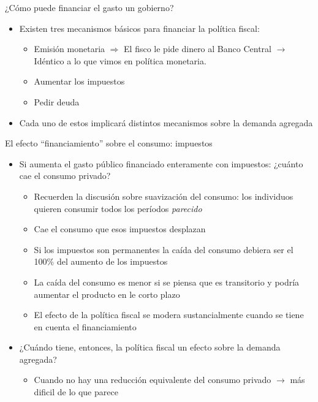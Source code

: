 \documentclass{beamer}
\begin{document}
\begin{frame}{¿Cómo puede financiar el gasto un gobierno?}
    \begin{itemize}
        \item Existen tres mecanismos básicos para financiar la política fiscal:
        \begin{itemize}
            \item Emisión monetaria $\Rightarrow$ El fisco le pide dinero al Banco Central $\rightarrow$ Idéntico a lo que vimos en política monetaria.
            \item Aumentar los impuestos 
            \item Pedir deuda
        \end{itemize}
        \item Cada uno de estos implicará distintos mecanismos sobre la demanda agregada
    \end{itemize}
\end{frame}

\begin{frame}{El efecto “financiamiento” sobre el consumo: impuestos}
    \begin{itemize}
        \item Si aumenta el gasto público financiado enteramente con impuestos: ¿cuánto cae el consumo privado?
        \begin{itemize}
            \item Recuerden la discusión sobre suavización del consumo: los individuos quieren consumir todos los períodos \textit{parecido}
            \item Cae el consumo que esos impuestos desplazan
            \item Si los impuestos son permanentes la caída del consumo debiera ser el 100\% del aumento de los impuestos
            \item La caída del consumo es menor si se piensa que es transitorio y podría aumentar el producto en le corto plazo
            \item El efecto de la política fiscal se modera sustancialmente cuando se tiene en cuenta el financiamiento
        \end{itemize}
        \item ¿Cuándo tiene, entonces, la política fiscal un efecto sobre la demanda agregada?
        \begin{itemize}
            \item Cuando no hay una reducción equivalente del consumo privado $\rightarrow$ más dificil de lo que parece
        \end{itemize}
    \end{itemize}
\end{frame}
\end{document}
